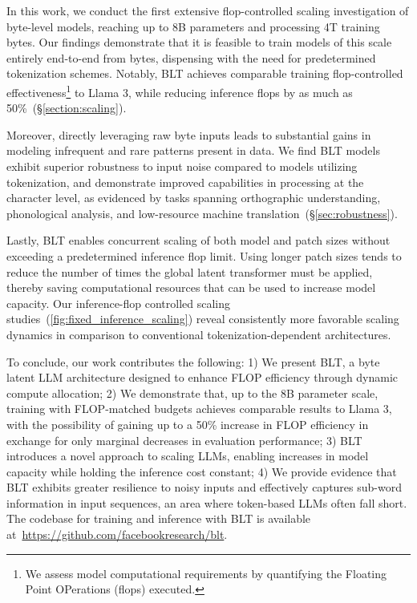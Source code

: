 In this work, we conduct the first extensive flop-controlled scaling investigation of byte-level models, reaching up to 8B parameters and processing 4T training bytes. Our findings demonstrate that it is feasible to train models of this scale entirely end-to-end from bytes, dispensing with the need for predetermined tokenization schemes. Notably, {\textsc BLT} achieves comparable training flop-controlled effectiveness\footnote{We assess model computational requirements by quantifying the Floating Point OPerations (flops) executed.} to Llama 3, while reducing inference flops by as much as 50\%~(\S\ref{section:scaling}). 

Moreover, directly leveraging raw byte inputs leads to substantial gains in modeling infrequent and rare patterns present in data. We find {\textsc BLT} models exhibit superior robustness to input noise compared to models utilizing tokenization, and demonstrate improved capabilities in processing at the character level, as evidenced by tasks spanning orthographic understanding, phonological analysis, and low-resource machine translation~(\S\ref{sec:robustness}).

Lastly, {\textsc BLT} enables concurrent scaling of both model and patch sizes without exceeding a predetermined inference flop limit. Using longer patch sizes tends to reduce the number of times the global latent transformer must be applied, thereby saving computational resources that can be used to increase model capacity. Our inference-flop controlled scaling studies~(\autoref{fig:fixed_inference_scaling}) reveal consistently more favorable scaling dynamics in comparison to conventional tokenization-dependent architectures.

To conclude, our work contributes the following: 1) We present {\textsc BLT}, a byte latent LLM architecture designed to enhance FLOP efficiency through dynamic compute allocation; 2) We demonstrate that, up to the 8B parameter scale, training with FLOP-matched budgets achieves comparable results to Llama 3, with the possibility of gaining up to a 50\% increase in FLOP efficiency in exchange for only marginal decreases in evaluation performance; 3) {\textsc BLT} introduces a novel approach to scaling LLMs, enabling increases in model capacity while holding the inference cost constant; 4) We provide evidence that {\textsc BLT} exhibits greater resilience to noisy inputs and effectively captures sub-word information in input sequences, an area where token-based LLMs often fall short. The codebase for training and inference with {\textsc BLT} is available at~\url{https://github.com/facebookresearch/blt}.

